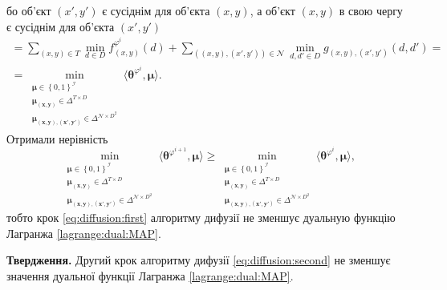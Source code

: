 бо об'єкт $\left(x', y' \right)$ є сусіднім для об'єкта $\left(x, y \right)$,
а об'єкт $\left(x, y \right)$ в свою чергу є сусіднім для об'єкта
$\left(x', y' \right)$
\begin{equation*}
\begin{gathered}
    = \sum \limits_{\left(x, y \right) \in T}
        \min \limits_{d \in D}
            f_{\left(x, y \right)}^{\varphi^i} \left( d \right) +
    \sum \limits_{\left(\left(x, y \right), \left(x', y' \right) \right) \in \mathcal{N}}
        \min \limits_{d, d' \in D}
            g_{\left(x, y \right), \left(x', y' \right)} \left( d, d' \right) = \\
    = \min \limits_{\substack{\pmb{\mu} \in \left\{ 0, 1 \right\}^{\mathcal{I}} \\
                            \pmb{\mu_{\left(x, y \right)}} \in \Delta^{T \times D} \\
                            \pmb{\mu_{\left(x, y \right), \left(x', y' \right)}} \in
                                \Delta^{\mathcal{N} \times D^2}}}
        \langle \pmb{\theta}^{\varphi^i}, \pmb{\mu} \rangle.
\end{gathered}
\end{equation*}
Отримали нерівність
\begin{equation*}
    \min \limits_{\substack{\pmb{\mu} \in \left\{ 0, 1 \right\}^{\mathcal{I}} \\
                            \pmb{\mu_{\left(x, y \right)}} \in \Delta^{T \times D} \\
                            \pmb{\mu_{\left(x, y \right), \left(x', y' \right)}} \in
                                \Delta^{\mathcal{N} \times D^2}}}
        \langle \pmb{\theta}^{\varphi^{i + 1}}, \pmb{\mu} \rangle \ge
    \min \limits_{\substack{\pmb{\mu} \in \left\{ 0, 1 \right\}^{\mathcal{I}} \\
                            \pmb{\mu_{\left(x, y \right)}} \in \Delta^{T \times D} \\
                            \pmb{\mu_{\left(x, y \right), \left(x', y' \right)}} \in
                                \Delta^{\mathcal{N} \times D^2}}}
        \langle \pmb{\theta}^{\varphi^i}, \pmb{\mu} \rangle,
\end{equation*}
тобто крок \eqref{eq:diffusion:first}
алгоритму дифузії не зменшує дуальную функцію Лагранжа \eqref{lagrange:dual:MAP}.

\textbf{Твердження.}
Другий крок алгоритму дифузії \eqref{eq:diffusion:second}
не зменшує значення дуальної функції Лагранжа \eqref{lagrange:dual:MAP}.


